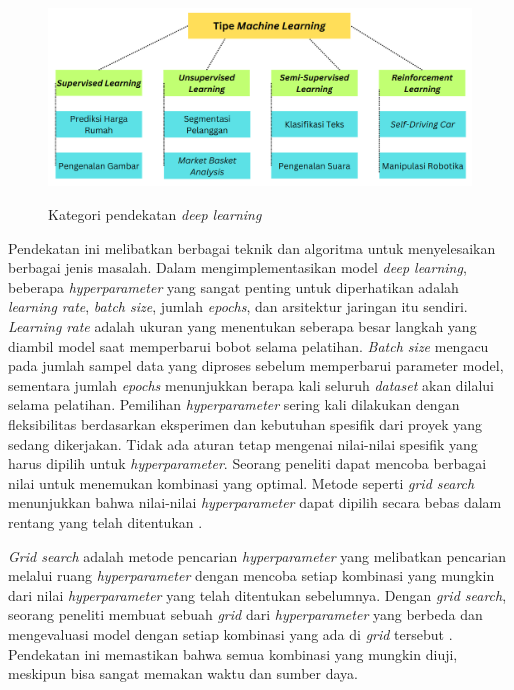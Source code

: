 \begin{figure}[H]
    \centering
    {\includegraphics [width=\textwidth]{image/bab2/pendekatan-deep-learning.png}}
    \caption{Kategori pendekatan \textit{deep learning}}
    \label{pendekatan-deeplearning}
\end{figure}


\par Pendekatan ini melibatkan berbagai teknik dan algoritma untuk menyelesaikan berbagai jenis masalah. Dalam mengimplementasikan model \textit{deep learning}, beberapa \textit{hyperparameter} yang sangat penting untuk diperhatikan adalah \textit{learning rate}, \textit{batch size}, jumlah \textit{epochs}, dan arsitektur jaringan itu sendiri. \textit{Learning rate} adalah ukuran yang menentukan seberapa besar langkah yang diambil model saat memperbarui bobot selama pelatihan. \textit{Batch size} mengacu pada jumlah sampel data yang diproses sebelum memperbarui parameter model, sementara jumlah \textit{epochs} menunjukkan berapa kali seluruh \textit{dataset} akan dilalui selama pelatihan. Pemilihan \textit{hyperparameter} sering kali dilakukan dengan fleksibilitas berdasarkan eksperimen dan kebutuhan spesifik dari proyek yang sedang dikerjakan. Tidak ada aturan tetap mengenai nilai-nilai spesifik yang harus dipilih untuk \textit{hyperparameter}. Seorang peneliti dapat mencoba berbagai nilai untuk menemukan kombinasi yang optimal. Metode seperti \textit{grid search} menunjukkan bahwa nilai-nilai \textit{hyperparameter} dapat dipilih secara bebas dalam rentang yang telah ditentukan \citep{bergstra2012random}.


\par \textit{Grid search} adalah metode pencarian \textit{hyperparameter} yang melibatkan pencarian melalui ruang \textit{hyperparameter} dengan mencoba setiap kombinasi yang mungkin dari nilai \textit{hyperparameter} yang telah ditentukan sebelumnya. Dengan \textit{grid search}, seorang peneliti membuat sebuah \textit{grid} dari \textit{hyperparameter} yang berbeda dan mengevaluasi model dengan setiap kombinasi yang ada di \textit{grid} tersebut \citep{bergstra2012random}. Pendekatan ini memastikan bahwa semua kombinasi yang mungkin diuji, meskipun bisa sangat memakan waktu dan sumber daya.



